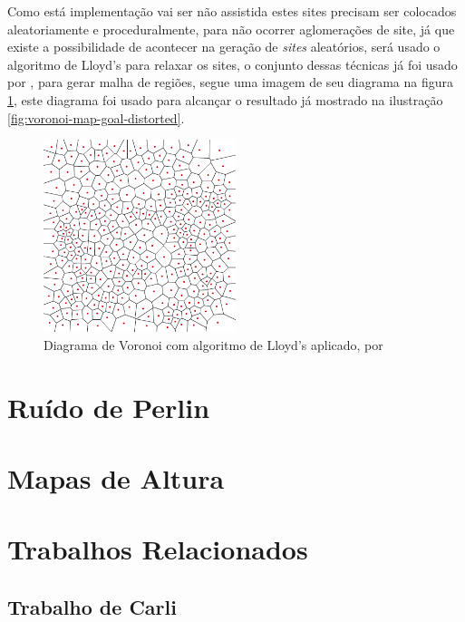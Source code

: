 Como está implementação vai ser não assistida estes sites precisam ser colocados
aleatoriamente e proceduralmente, para não ocorrer aglomerações de site, já
que existe a possibilidade de acontecer na geração de \textit{sites} aleatórios,
será usado o algoritmo de Lloyd's para relaxar os sites, o conjunto dessas
técnicas já foi usado por \cite{patel2010polygonal}, para gerar malha de regiões,
segue uma imagem de seu diagrama na figura \ref{fig:voronoi-2-lloyd}, este diagrama
foi usado para alcançar o resultado já mostrado na ilustração \ref{fig:voronoi-map-goal-distorted}.
\begin{figure}[H]
    \centering
    \includegraphics[width=0.5\textwidth]{figuras/voronoi-2-lloyd.png}
    \caption{Diagrama de Voronoi com algoritmo de Lloyd's aplicado, por \cite{patel2010polygonal}}
    \label{fig:voronoi-2-lloyd}
\end{figure}

\section{Ruído de Perlin}

\section{Mapas de Altura}

\section{Trabalhos Relacionados}

\subsection{Trabalho de Carli}


